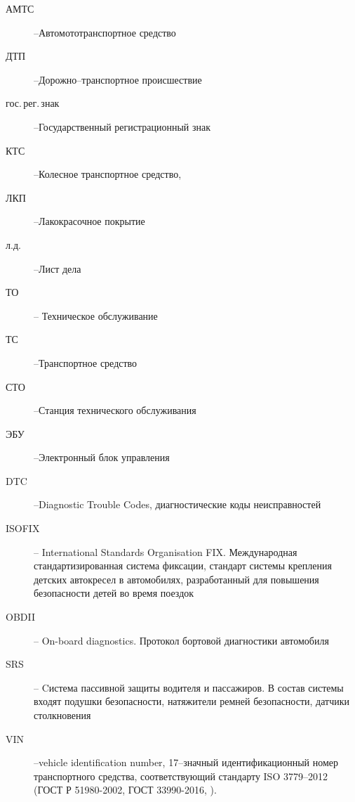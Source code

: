 \begin{description}
	\item[АМТС] --Автомототранспортное средство
	\item[ДТП] --Дорожно--транспортное происшествие
	\item[гос.\,рег.\,знак] --Государственный регистрационный знак
	\item[КТС] --Колесное транспортное средство, \cite{33997:gost}
	\item[ЛКП] --Лакокрасочное покрытие
	\item[л.д.] --Лист дела
	\item[ТО] -- Техническое обслуживание
	\item[ТС] --Транспортное средство
	\item[СТО] --Станция технического обслуживания
	\item[ЭБУ] --Электронный блок управления
	\item[DTC] --Diagnostic Trouble Codes, диагностические коды неисправностей
	\item[ISOFIX]--  International Standards Organisation FIX. Международная стандартизированная система фиксации,  стандарт системы крепления детских автокресел в автомобилях, разработанный для повышения безопасности детей во время поездок	
	\item[OBDII] -- On-board diagnostics. Протокол бортовой диагностики автомобиля
	\item[SRS] -- Cистема пассивной защиты водителя и пассажиров. В состав системы входят подушки безопасности, натяжители ремней безопасности, датчики столкновения
	\item[VIN] --vehicle identification number, 17--значный идентификационный номер транспортного средства, соответствующий стандарту ISO 3779--2012 (ГОСТ Р 51980-2002, ГОСТ 33990-2016, \cite{51980:gost}).
\end{description}